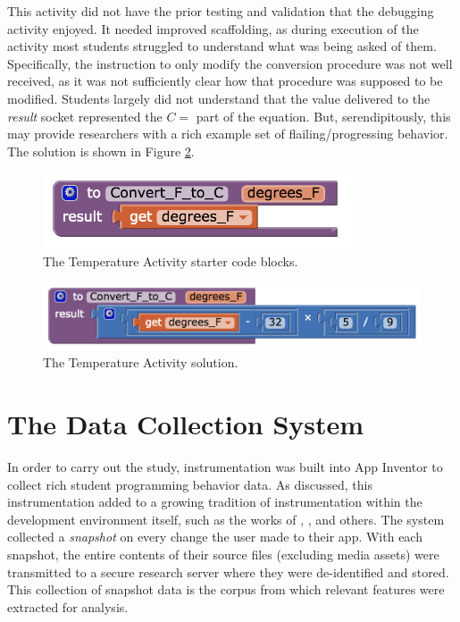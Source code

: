 This activity did not have the prior testing and validation that the debugging activity enjoyed. It needed improved scaffolding, as during execution of the activity most students struggled to understand what was being asked of them. Specifically, the instruction to only modify the conversion procedure was not well received, as it was not sufficiently clear how that procedure was supposed to be modified. Students largely did not understand that the value delivered to the \emph{result} socket represented the $C=$ part of the equation. But, serendipitously, this may provide researchers with a rich example set of flailing/progressing behavior. The solution is shown in Figure \ref{fig:temperature1}.

\begin{figure}
  \centering
      \includegraphics[width=3.6in]{images/temperatureActivity/temperature0start}
  \caption[Temperature Activity Starter Code Blocks]{The Temperature Activity starter code blocks.}
  \label{fig:temperature0}
\end{figure}

\begin{figure}
  \centering
      \includegraphics[width=\textwidth]{images/temperatureActivity/temperature1solution}
  \caption[Temperature Activity Solution]{The Temperature Activity solution.}
  \label{fig:temperature1}
\end{figure}



\section{The Data Collection System}
In order to carry out the study, instrumentation was built into App Inventor to collect rich student programming behavior data. As discussed, this instrumentation added to a growing tradition of instrumentation within the development environment itself, such as the works of \citet{berland-2013}, \citet{lipman-phd}, and others. The system collected a \emph{snapshot} on every change the user made to their app. With each snapshot, the entire contents of their source files (excluding media assets) were transmitted to a secure research server where they were de-identified and stored. This collection of snapshot data is the corpus from which relevant features were extracted for analysis.

